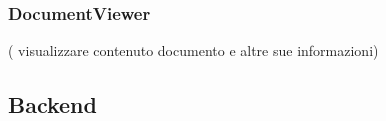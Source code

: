 \documentclass[10pt, a4paper]{article}
\begin{document}
\subsubsection{DocumentViewer}( visualizzare contenuto documento e altre sue informazioni)





\subsection{Backend}
    
\end{document}
